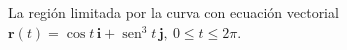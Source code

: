 \item La región limitada por la curva con ecuación vectorial $\mathbf{r}(t) = \cos t \, \mathbf{i} + \operatorname{sen}^3 t \, \mathbf{j}, \ 0 \le t \le 2\pi$.

